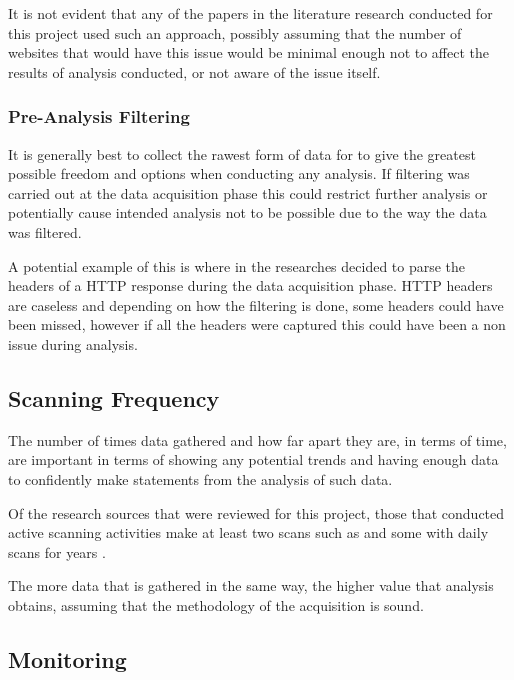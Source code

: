 \documentclass{mscreport}
\begin{document}
\vspace{0.3cm} \noindent
It is not evident that any of the papers in the literature research conducted for this project used such an approach, possibly assuming that the number of websites that would have this issue would be minimal enough not to affect the results of analysis conducted, or not aware of the issue itself.

\subsubsection{Pre-Analysis Filtering}
It is generally best to collect the rawest form of data for to give the greatest possible freedom and options when conducting any analysis. If filtering was carried out at the data acquisition phase this could restrict further analysis or potentially cause intended analysis not to be possible due to the way the data was filtered.

\vspace{0.3cm} \noindent
A potential example of this is where in \cite{Buchanan2018-xz} the researches decided to parse the headers of a HTTP response during the data acquisition phase. HTTP headers are caseless \cite{Berners-Lee1996-ji} and depending on how the filtering is done, some headers could have been missed, however if all the headers were captured this could have been a non issue during analysis.

\subsection{Scanning Frequency}

The number of times data gathered and how far apart they are, in terms of time, are important in terms of showing any potential trends and having enough data to confidently make statements from the analysis of such data.

\vspace{0.3cm} \noindent
Of the research sources that were reviewed for this project, those that conducted active scanning activities make at least two scans such as \cite{Buchanan2018-xz,Amann2017-co,Chen2016-dl,Kumar2017-qw} and some with daily scans for years \cite{Holz2020-ha}.

\vspace{0.3cm} \noindent
The more data that is gathered in the same way, the higher value that analysis obtains, assuming that the methodology of the acquisition is sound.

\subsection{Monitoring}
\end{document}
